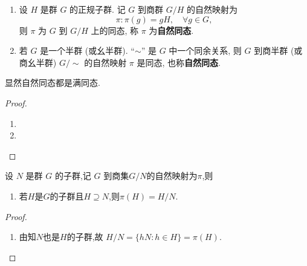 \documentclass[../../main.tex]{subfiles}%
\begin{document}
\begin{theorem}\label{theorem:抽象代数--1.5.}
\begin{enumerate}
\item 设 \( H \) 是群 \( G \) 的正规子群. 记 \( G \) 到商群 \( G/H \) 的自然映射为
\[
\pi: \pi(g) = gH, \quad \forall g \in G,
\]
则 \( \pi \) 为 \( G \) 到 \( G/H \) 上的同态, 称 \( \pi \) 为\textbf{自然同态}.

\item 若 \( G \) 是一个半群 (或幺半群). “\(\sim\)” 是 \( G \) 中一个同余关系, 则 \( G \) 到商半群 (或商幺半群) \( G/\sim \) 的自然映射 \( \pi \) 是同态, 也称\textbf{自然同态}.
\end{enumerate}
\end{theorem}
\begin{remark}
显然自然同态都是满同态.
\end{remark}
\begin{proof}
\begin{enumerate}
\item 

\item 
\end{enumerate}
\end{proof}

\begin{proposition}\label{proposition:群的自然映射的基本性质}
设 \( N \) 是群 \( G \) 的子群,记 \( G \) 到商集\( G/N \)的自然映射为$\pi$,则
\begin{enumerate}[(1)]
\item\label{proposition:群的自然映射的基本性质-1} 若$H$是$G$的子群且$H\supseteq N$,则$\pi(H)=H/N.$

\end{enumerate}
\end{proposition}
\begin{proof}
\begin{enumerate}[(1)]
\item 由知$N$也是$H$的子群,故
$H/N=\{hN:h\in H\}=\pi(H).$
\end{enumerate}
\end{proof}
\end{document}
